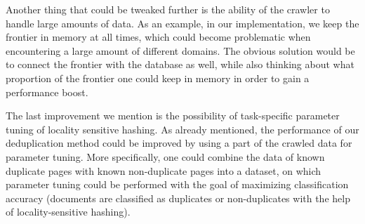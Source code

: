 \documentclass[9pt]{IEEEtran}
\begin{document}
Another thing that could be tweaked further is the ability of the crawler to handle large amounts of data.
As an example, in our implementation, we keep the frontier in memory at all times, which could become problematic when encountering a large amount of different domains.
The obvious solution would be to connect the frontier with the database as well, while also thinking about what proportion of the frontier one could keep in memory in order to gain a performance boost.

The last improvement we mention is the possibility of task-specific parameter tuning of locality sensitive hashing.
As already mentioned, the performance of our deduplication method could be improved by using a part of the crawled data for parameter tuning.
More specifically, one could combine the data of known duplicate pages with known non-duplicate pages into a dataset, on which parameter tuning could be performed with the goal of maximizing classification accuracy (documents are classified as duplicates or non-duplicates with the help of locality-sensitive hashing).
 





\end{document}
